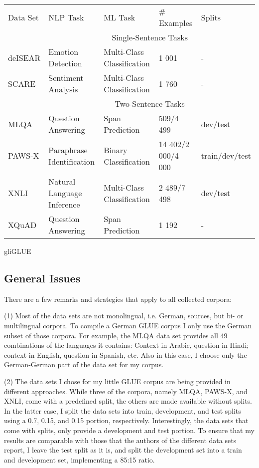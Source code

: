 {\begin{tabular}{l|llll}
	Data Set & NLP Task & ML Task & \# Examples & Splits \\
	\hhline{=|====}
	& \multicolumn{4}{c}{Single-Sentence Tasks} \\
	deISEAR &  Emotion Detection & Multi-Class Classification  & 1 001 & - \\
	SCARE & Sentiment Analysis & Multi-Class Classification & 1 760 & - \\
	\hline
	& \multicolumn{4}{c}{Two-Sentence Tasks} \\
	MLQA & Question Answering & Span Prediction & 509/4 499 & dev/test \\
	PAWS-X & Paraphrase Identification & Binary Classification & 14 402/2 000/4 000 & train/dev/test \\
	XNLI & Natural Language Inference & Multi-Class Classification &  2 489/7 498 & dev/test \\
	XQuAD & Question Answering & Span Prediction &  1 192 & - \\
\end{tabular}
}{gliGLUE}

\subsection{General Issues}

There are a few remarks and strategies that apply to all collected corpora:

(1) Most of the data sets are not monolingual, i.e. German, sources, but bi- or multilingual corpora.
To compile a German GLUE corpus I only use the German subset of those corpora.
For example, the MLQA data set provides all 49 combinations of the languages it contains:
Context in Arabic, question in Hindi; context in English, question in Spanish, etc.
Also in this case, I choose only the German-German part of the data set for my corpus.

(2) The data sets I chose for my little GLUE corpus are being provided in different approaches.
While three of the corpora, namely MLQA, PAWS-X, and XNLI, come with a predefined split, the others are made available without splits.
In the latter case, I split the data sets into train, development, and test splits using a 0.7, 0.15, and 0.15 portion, respectively.
Interestingly, the data sets that come with splits, only provide a development and test portion.
To ensure that my results are comparable with those that the authors of the different data sets report, I leave the test split as it is, and split the development set into a train and development set, implementing a 85:15 ratio.

